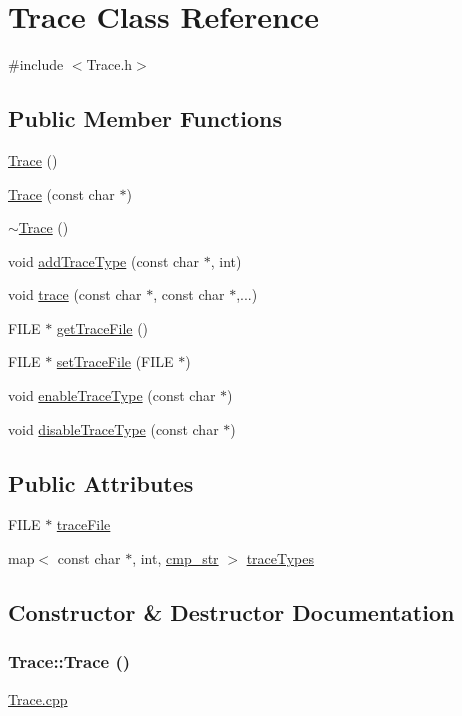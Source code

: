 \hypertarget{classTrace}{
\section{Trace Class Reference}
\label{classTrace}
}


{\ttfamily \#include $<$Trace.h$>$}\subsection*{Public Member Functions}
\begin{DoxyCompactItemize}
\item 
\hyperlink{classTrace_aafef8ed744b967d133c34c8a813f7fc5}{Trace} ()
\item 
\hyperlink{classTrace_ae1caa27c33613b7645a212c31d19bc68}{Trace} (const char $\ast$)
\item 
\hyperlink{classTrace_a39492ecec74969a4905ec5fcf026dc09}{$\sim$Trace} ()
\item 
void \hyperlink{classTrace_a307942e3b0179af28fb7a7a0868fe4b1}{addTraceType} (const char $\ast$, int)
\item 
void \hyperlink{classTrace_a17c20d8abd43a042ac5a75e82d45047b}{trace} (const char $\ast$, const char $\ast$,...)
\item 
FILE $\ast$ \hyperlink{classTrace_ac0b94d02155d5b9a1bf457801cfeb120}{getTraceFile} ()
\item 
FILE $\ast$ \hyperlink{classTrace_a750f5adef7ebc7c23ecb0a8c90af1f85}{setTraceFile} (FILE $\ast$)
\item 
void \hyperlink{classTrace_aba8fd6ff6e39496ca25050ae01800523}{enableTraceType} (const char $\ast$)
\item 
void \hyperlink{classTrace_ace78e6fb4da6fc7cb85ec4ee5421c148}{disableTraceType} (const char $\ast$)
\end{DoxyCompactItemize}
\subsection*{Public Attributes}
\begin{DoxyCompactItemize}
\item 
FILE $\ast$ \hyperlink{classTrace_add836c59b7ac76f215560d71343b5c62}{traceFile}
\item 
map$<$ const char $\ast$, int, \hyperlink{structcmp__str}{cmp\_\-str} $>$ \hyperlink{classTrace_af65cfa6584d7f34ea3809d727675e729}{traceTypes}
\end{DoxyCompactItemize}


\subsection{Constructor \& Destructor Documentation}
\hypertarget{classTrace_aafef8ed744b967d133c34c8a813f7fc5}{
\subsubsection[{Trace}]{\setlength{\rightskip}{0pt plus 5cm}Trace::Trace ()}}
\label{classTrace_aafef8ed744b967d133c34c8a813f7fc5}
\hyperlink{Trace_8cpp}{Trace.cpp}

